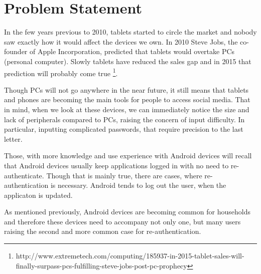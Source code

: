 
\chapter{Problem Statement} %


In the few years previous to 2010, tablets started to circle the market and nobody saw exactly how it would affect the devices we own. In 2010 Steve Jobs, the co-founder of Apple Incorporation, predicted that tablets would overtake PCs (personal computer). Slowly tablets have reduced the sales gap and in 2015 that prediction will probably come true \footnote[7]{http://www.extremetech.com/computing/185937-in-2015-tablet-sales-will-finally-surpass-pcs-fulfilling-steve-jobs-post-pc-prophecy}.

Though PCs will not go anywhere in the near future, it still means that tablets and phones are becoming the main tools for people to access social media. That in mind, when we look at these devices, we can immediately notice the size and lack of peripherals compared to PCs, raising the concern of input difficulty. In particular, inputting complicated passwords, that require precision to the last letter. 

Those, with  more knowledge and use experience with Android devices will recall that Android devices usually keep applications logged in with no need to re-authenticate. Though that is mainly true, there are cases, where re-authentication is necessary. Android tends to log out the user, when the applicaton is updated. 

As mentioned previously, Android devices are becoming common for households and therefore these devices need to accompany not only one, but many users raising the second and more common case for re-authentication. 




\ifpdf
    \graphicspath{{X/figures/PNG/}{X/figures/PDF/}{X/figures/}}
\else
    \graphicspath{{X/figures/EPS/}{X/figures/}}
\fi


